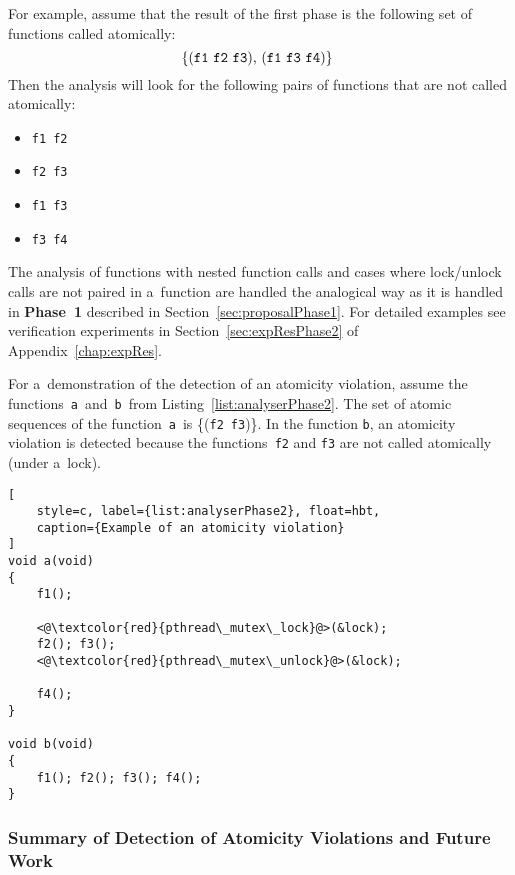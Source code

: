 \begin{example}
    For example, assume that the result of the first phase is the following
    set of functions called atomically:
    $$
        \text{%
            \{(\texttt{f1}~\texttt{f2}~\texttt{f3}),
            (\texttt{f1}~\texttt{f3}~\texttt{f4})\}
        }
    $$
    Then the analysis will look
    for the following pairs of functions that are not called atomically:
    \begin{itemize}
        \item \texttt{f1}~\texttt{f2}
        \item \texttt{f2}~\texttt{f3}
        \item \texttt{f1}~\texttt{f3}
        \item \texttt{f3}~\texttt{f4}
    \end{itemize}
\end{example}

The analysis of functions with nested function calls and cases
where lock/unlock calls are not paired in a~function are handled
the analogical way as it is handled in \textbf{Phase~1} described in
Section~\ref{sec:proposalPhase1}. For detailed examples see verification
experiments in Section~\ref{sec:expResPhase2} of Appendix~\ref{chap:expRes}.

\begin{example}
    For a~demonstration of the detection of an atomicity violation, assume
    the functions~\texttt{a}~and~\texttt{b}~from
    Listing~\ref{list:analyserPhase2}. The set of atomic sequences of the
    function~\texttt{a}~is \{(\texttt{f2}~\texttt{f3})\}. In the function
    \texttt{b}, an atomicity violation is detected because the
    functions~\texttt{f2} and \texttt{f3} are not called atomically (under
    a~lock).
\end{example}

\begin{lstlisting}[
    style=c, label={list:analyserPhase2}, float=hbt,
    caption={Example of an atomicity violation}
]
void a(void)
{
    f1();

    <@\textcolor{red}{pthread\_mutex\_lock}@>(&lock);
    f2(); f3();
    <@\textcolor{red}{pthread\_mutex\_unlock}@>(&lock);

    f4();
}

void b(void)
{
    f1(); f2(); f3(); f4();
}
\end{lstlisting}

\subsubsection{Summary of Detection of Atomicity Violations and Future Work}


